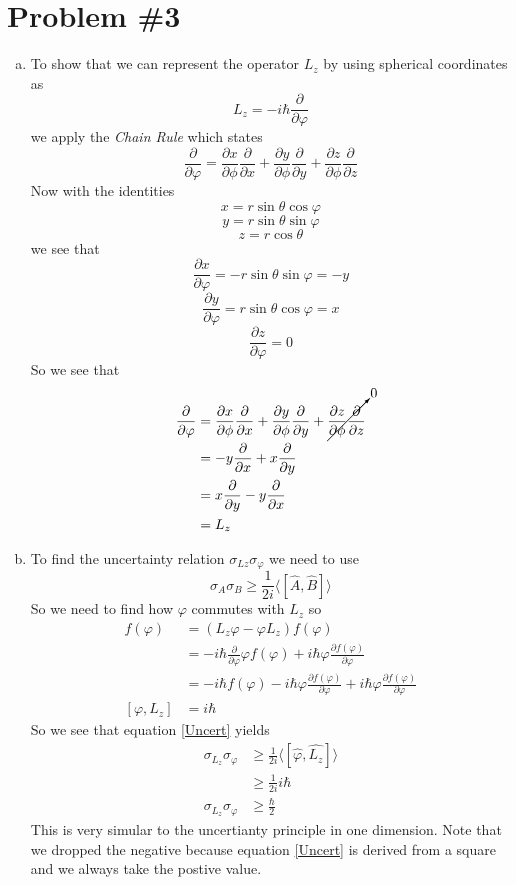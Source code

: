 \documentclass[11pt]{article}
\numberwithin{equation}{section}
\begin{document}
\section{Problem \#3}
\begin{enumerate}[(a)]
\item
To show that we can represent the operator $L_z$ by using spherical coordinates as
$$L_z = -i\hbar\frac{\partial}{\partial\varphi}$$
we apply the \emph{Chain Rule} which states
$$\frac{\partial}{\partial\varphi} = \frac{\partial x}{\partial\phi}\frac{\partial}{\partial x} + \frac{\partial y}{\partial\phi}\frac{\partial}{\partial y} + \frac{\partial z}{\partial\phi}\frac{\partial}{\partial z}$$
Now with the identities 
$$x = r\sin\theta\cos\varphi$$
$$y = r\sin\theta\sin\varphi$$
$$z = r\cos\theta$$
we see that 
$$\frac{\partial x}{\partial\varphi} = -r\sin\theta\sin\varphi = -y$$
$$\frac{\partial y}{\partial\varphi} = r\sin\theta\cos\varphi= x$$
$$\frac{\partial z}{\partial\varphi} = 0$$
So we see that 
\begin{align*}
\frac{\partial}{\partial\varphi} &= \frac{\partial x}{\partial\phi}\frac{\partial}{\partial x} + \frac{\partial y}{\partial\phi}\frac{\partial}{\partial y} + \cancelto{0}{\frac{\partial z}{\partial\phi}\frac{\partial}{\partial z}}\\
&= -y\frac{\partial}{\partial x} + x\frac{\partial}{\partial y}\\
&=  x\frac{\partial}{\partial y}-y\frac{\partial}{\partial x}\\
&= L_z
\end{align*}

\item
To find the uncertainty relation $\sigma_{Lz}\sigma_{\varphi}$ we need to use 
\begin{equation}
\sigma_A\sigma_B \ge \frac{1}{2i}\langle[\hat{A},\hat{B}]\rangle
\label{Uncert}
\end{equation}
So we need to find how $\varphi$ commutes with $L_z$ so
\begin{align*}
[L_z,\varphi]f(\varphi) &= (L_z\varphi - \varphi L_z)f(\varphi)\\
&= -i\hbar\frac{\partial}{\partial\varphi}\varphi f(\varphi) +  i\hbar\varphi\frac{\partial f(\varphi)}{\partial\varphi}\\
&= -i\hbar f(\varphi)- i\hbar\varphi\frac{\partial f(\varphi)}{\partial\varphi} +  i\hbar\varphi\frac{\partial f(\varphi)}{\partial\varphi}\\
[\varphi, L_z] &= i\hbar
\end{align*}
So we see that equation \ref{Uncert} yields
\begin{align*}
\sigma_{L_z}\sigma_{\varphi} &\ge \frac{1}{2i}\langle[\hat{\varphi},\hat{L_z}]\rangle\\
&\ge \frac{1}{2i}i\hbar\\
\sigma_{L_z}\sigma_{\varphi} &\ge \frac{\hbar}{2}
\end{align*}
This is very simular to the uncertianty principle in one dimension. Note that we dropped the negative because equation \ref{Uncert} is derived from a square and we always take the postive value.


\end{enumerate}
\end{document}
